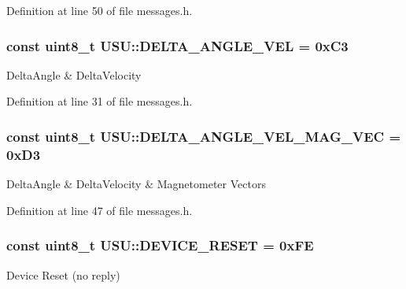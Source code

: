 \-Definition at line 50 of file messages.\-h.

\hypertarget{namespace_u_s_u_acaafc8eff5346d9c529238dd0ceb61a6}{
\subsubsection[{\-D\-E\-L\-T\-A\-\_\-\-A\-N\-G\-L\-E\-\_\-\-V\-E\-L}]{\setlength{\rightskip}{0pt plus 5cm}const uint8\-\_\-t {\bf \-U\-S\-U\-::\-D\-E\-L\-T\-A\-\_\-\-A\-N\-G\-L\-E\-\_\-\-V\-E\-L} = 0x\-C3}}\label{namespace_u_s_u_acaafc8eff5346d9c529238dd0ceb61a6}
\-Delta\-Angle \& \-Delta\-Velocity 

\-Definition at line 31 of file messages.\-h.

\hypertarget{namespace_u_s_u_a18e6e53c69e61c3538c351bb86c77629}{
\subsubsection[{\-D\-E\-L\-T\-A\-\_\-\-A\-N\-G\-L\-E\-\_\-\-V\-E\-L\-\_\-\-M\-A\-G\-\_\-\-V\-E\-C}]{\setlength{\rightskip}{0pt plus 5cm}const uint8\-\_\-t {\bf \-U\-S\-U\-::\-D\-E\-L\-T\-A\-\_\-\-A\-N\-G\-L\-E\-\_\-\-V\-E\-L\-\_\-\-M\-A\-G\-\_\-\-V\-E\-C} = 0x\-D3}}\label{namespace_u_s_u_a18e6e53c69e61c3538c351bb86c77629}
\-Delta\-Angle \& \-Delta\-Velocity \& \-Magnetometer \-Vectors 

\-Definition at line 47 of file messages.\-h.

\hypertarget{namespace_u_s_u_a7c9f78c9bb18ba92a529bf5819f6a5d2}{
\subsubsection[{\-D\-E\-V\-I\-C\-E\-\_\-\-R\-E\-S\-E\-T}]{\setlength{\rightskip}{0pt plus 5cm}const uint8\-\_\-t {\bf \-U\-S\-U\-::\-D\-E\-V\-I\-C\-E\-\_\-\-R\-E\-S\-E\-T} = 0x\-F\-E}}\label{namespace_u_s_u_a7c9f78c9bb18ba92a529bf5819f6a5d2}
\-Device \-Reset (no reply) 

